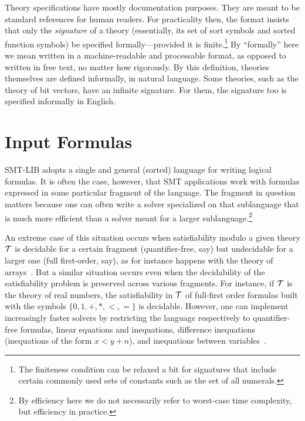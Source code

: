 Theory specifications have mostly documentation purposes.
They are meant to be standard references for human readers.
For practicality then, the format insists that only the \emph{signature} of 
a theory (essentially, its set of sort symbols and sorted function symbols) 
be specified formally---provided it is finite.\footnote{
The finiteness condition can be relaxed a bit for signatures
that include certain commonly used sets of constants such as 
the set of all numerals.
}
By ``formally'' here 
we mean written in a machine-readable and processable format,
as opposed to written in free text, no matter how rigorously.
By this definition, theories themselves are defined informally, 
in natural language.
%
Some theories, such as the theory of bit vectors, have an infinite signature.
For them, the signature too is specified informally in English.

\section{Input Formulas}

SMT-LIB adopts a single and general (sorted) language for writing
logical formulas.
It is often the case, however, that 
SMT applications work with formulas expressed in some particular fragment 
of the language.
The fragment in question matters
because one can often write a solver specialized on that sublanguage 
that is much more efficient than a solver meant for a larger sublanguage.\footnote{
By efficiency here we do not necessarily refer to worst-case time complexity,
but efficiency in practice.
}

An extreme case of this situation occurs
when satisfiability modulo a given theory $\mathcal{T}$
is decidable for a certain fragment (quantifier-free, say)
but undecidable for a larger one (full first-order, say),
as for instance happens with the theory of arrays~\cite{BraMS-VMCAI-06}.
But a similar situation occurs even
when the decidability of the satisfiability problem is preserved 
across various fragments.
For instance, 
if $\mathcal{T}$ is the theory of real numbers,
the satisfiability in $\mathcal{T}$ of full-first order formulas
built with the symbols $\{0,1,+,*,<,=\}$ is decidable.
However, one can implement increasingly faster solvers by restricting
the language respectively to quantifier-free formulas, 
linear equations and inequations,
difference inequations (inequations of the form $x < y + n$),
and
inequations between variables~\cite{Bozzanoetal2005TACAS}.

